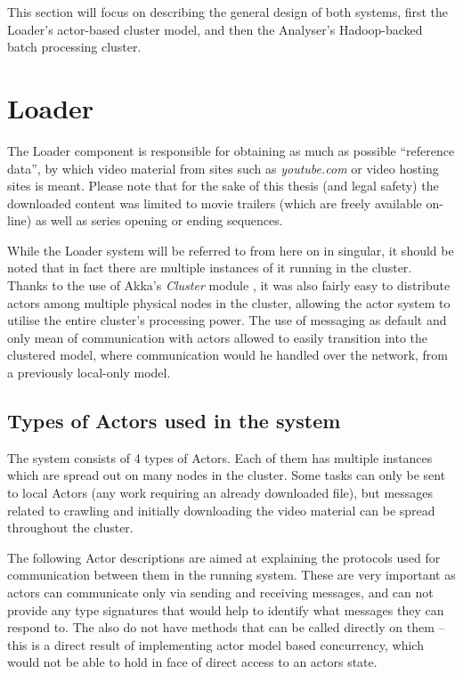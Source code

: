 This section will focus on describing the general design of both systems, first the Loader's actor-based cluster model, and then the Analyser's Hadoop-backed batch processing cluster.

\newpage
\section{Loader}
\label{sec:loader-basics}
The Loader component is responsible for obtaining as much as possible ``reference data'', by which video material from sites such as \textit{youtube.com} or video hosting sites is meant. Please note that for the sake of this thesis (and legal safety) the downloaded content was limited to movie trailers (which are freely available on-line) as well as series opening or ending sequences.

While the Loader system will be referred to from here on in singular, it should be noted that in fact there are multiple instances of it running in the cluster. Thanks to the use of Akka's \textit{Cluster} module \cite{akka-clustering}, it was also fairly easy to distribute actors among multiple physical nodes in the cluster, allowing the actor system to utilise the entire cluster's processing power. The use of messaging as default and only mean of communication with actors allowed to easily transition into the clustered model, where communication would he handled over the network, from a previously local-only model.

\subsection{Types of Actors used in the system}
\label{sec:types-of-actors}

The system consists of 4 types of Actors. Each of them has multiple instances which are spread out on many nodes in the cluster. Some tasks can only be sent to local Actors (any work requiring an already downloaded file), but messages related to crawling and initially downloading the video material can be spread throughout the cluster. 

The following Actor descriptions are aimed at explaining the protocols used for communication between them in the running system. These are very important as actors can communicate only via sending and receiving messages, and can not provide any type signatures that would help to identify what messages they can respond to. The also do not have methods that can be called directly on them -- this is a direct result of implementing actor model based concurrency, which would not be able to hold in face of direct access to an actors state.

